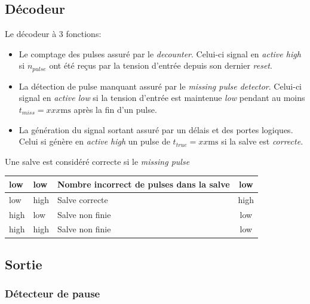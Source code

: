 \documentclass[french]{layout/Report}
\begin{document}
\subsection{Décodeur}
Le décodeur à 3 fonctions:
\begin{itemize}
    \item{Le comptage des pulses assuré par le \emph{decounter}. Celui-ci signal en \emph{active high} si $n_{pulse}$ ont été reçus par la tension d'entrée depuis son dernier \emph{reset}.}
    \item{La détection de pulse manquant assuré par le \emph{missing pulse detector}. Celui-ci signal en \emph{active low} si la tension d'entrée est maintenue \emph{low} pendant au moins $t_{miss} = xxx \si{\milli\second}$ après la fin d'un pulse.}
    \item{La génération du signal sortant assuré par un délais et des portes logiques. Celui si génère en \emph{active high} un pulse de $t_{true} = xx\si{\milli\second}$ si la salve est \emph{correcte}.}
\end{itemize}

Une salve est considéré correcte si le \emph{missing pulse }
\begin{center}
    \begin{tabular}{| m{4cm} | m{4cm} | l | c |}
        \hline
        low     & low       & Nombre incorrect de pulses dans la salve & low \\ \hline
        low     & high  & Salve correcte    & high\\ \hline
        high    & low       & Salve non finie & low \\ \hline
        high    & high  & Salve non finie & low \\ \hline
    \end{tabular}
\end{center}

\subsection{Sortie}

\subsubsection{Détecteur de pause}
\end{document}
